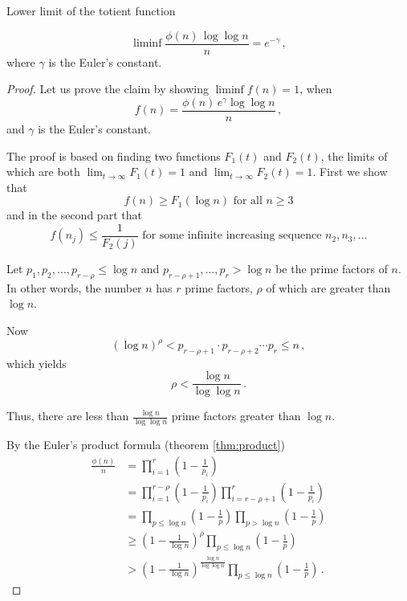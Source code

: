 \documentclass{article}
\begin{document}
\begin{theorem}
Lower limit of the totient function \cite{HW:phisigma}

\begin{equation*}
    \liminf{\frac{\phi(n)\,\log\log n}{n}}=e^{-\gamma}\,,
\end{equation*}
where $\gamma$ is the Euler's constant.

\begin{proof}

Let us prove the claim by showing $\liminf{f(n)} = 1$, when
\begin{equation*}
    f(n)= \frac{\phi(n)\,e^\gamma \log\log n}{n}\,,
\end{equation*}
and $\gamma$ is the Euler's constant.

The proof is based on finding two functions $F_1(t)$ and $F_2(t)$, the limits of which are both $\lim_{t\rightarrow \infty} F_1(t) = 1$ and $\lim_{t\rightarrow \infty} F_2(t) = 1$. First we show that 
\begin{equation}
\label{eq:first}
    f(n) \geq F_1(\log n)\text{ for all }n\geq 3
\end{equation}
and in the second part that
\begin{equation}
\label{eq:second}
    f(n_j) \leq \frac{1}{F_2(j)}\text{ for some infinite increasing sequence }n_2, n_3,\dots
\end{equation}

Let $p_1,p_2,\dots,p_{r-\rho} \leq \log n$ and $p_{r-\rho+1},\dots,p_r > \log n$ be the prime factors of $n$. In other words, the number $n$ has $r$ prime factors, $\rho$ of which are greater than $\log n$.

Now
\begin{equation*}
    (\log n)^\rho < p_{r-\rho+1} \cdot p_{r-\rho+2} \cdots p_r \leq n\,,
\end{equation*}
which yields
\begin{equation*}
    \rho < \frac{\log n}{\log\log n}\,.
\end{equation*}

Thus, there are less than $\frac{\log n}{\log\log n}$ prime factors greater than $\log n$.

By the Euler's product formula (theorem \ref{thm:product})
\begin{align*}
    \frac{\phi(n)}{n} & = \prod_{i=1}^r\left(1-\frac{1}{p_i}\right)\\
    & = \prod_{i=1}^{r-\rho}\left(1-\frac{1}{p_i}\right) \prod_{i=r-\rho+1}^r\left(1-\frac{1}{p_i}\right)\\
    & = \prod_{p\leq\log n}\left(1-\frac{1}{p}\right) \prod_{p>\log n}\left(1-\frac{1}{p}\right)\\
    & \geq \left(1-\frac{1}{\log n}\right)^\rho \prod_{p\leq\log n}\left(1-\frac{1}{p}\right) \\
    & > \left(1-\frac{1}{\log n}\right)^\frac{\log n}{\log \log n} \prod_{p\leq\log n}\left(1-\frac{1}{p}\right)\,.
\end{align*}


\end{proof}
\end{theorem}
\end{document}
